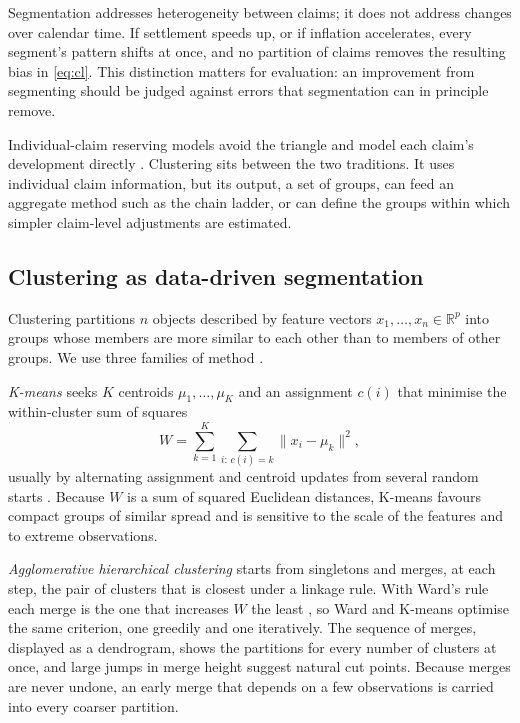 Segmentation addresses heterogeneity between claims; it does not address changes over calendar time. If settlement speeds up, or if inflation accelerates, every segment's pattern shifts at once, and no partition of claims removes the resulting bias in \eqref{eq:cl}. This distinction matters for evaluation: an improvement from segmenting should be judged against errors that segmentation can in principle remove.

Individual-claim reserving models avoid the triangle and model each claim's development directly \parencite{antonio2014micro,wuthrich2018machine}. Clustering sits between the two traditions. It uses individual claim information, but its output, a set of groups, can feed an aggregate method such as the chain ladder, or can define the groups within which simpler claim-level adjustments are estimated.

\subsection{Clustering as data-driven segmentation}
\label{sec:clustering}

Clustering partitions $n$ objects described by feature vectors $x_1,\dots,x_n \in \mathbb{R}^p$ into groups whose members are more similar to each other than to members of other groups. We use three families of method \parencite{hastie2009elements,jain2010data}.

\emph{K-means} seeks $K$ centroids $\mu_1,\dots,\mu_K$ and an assignment $c(i)$ that minimise the within-cluster sum of squares
\begin{equation}
W = \sum_{k=1}^{K} \sum_{i:\,c(i)=k} \lVert x_i - \mu_k \rVert^2 ,
\label{eq:kmeans}
\end{equation}
usually by alternating assignment and centroid updates from several random starts \parencite{lloyd1982least,macqueen1967some}. Because $W$ is a sum of squared Euclidean distances, K-means favours compact groups of similar spread and is sensitive to the scale of the features and to extreme observations.

\emph{Agglomerative hierarchical clustering} starts from singletons and merges, at each step, the pair of clusters that is closest under a linkage rule. With Ward's rule each merge is the one that increases $W$ the least \parencite{ward1963hierarchical}, so Ward and K-means optimise the same criterion, one greedily and one iteratively. The sequence of merges, displayed as a dendrogram, shows the partitions for every number of clusters at once, and large jumps in merge height suggest natural cut points. Because merges are never undone, an early merge that depends on a few observations is carried into every coarser partition.

